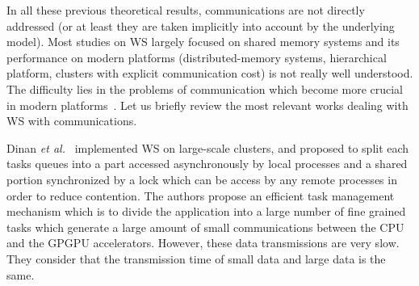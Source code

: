 

In all these previous theoretical results, communications are not directly addressed
(or at least they are taken implicitly into account by the underlying model).
Most studies on WS largely focused on shared memory systems and 
its performance on modern platforms (distributed-memory systems, hierarchical platform, clusters with explicit communication cost) is not really well understood. 
The difficulty lies in the problems of communication which become more crucial in modern platforms~\cite{Arafat2016}.
Let us briefly review the most relevant works dealing with WS with communications.

Dinan \textit{et al.}~\cite{Dinan2009} implemented WS on large-scale clusters,
and proposed to split each tasks queues into a part accessed asynchronously by local processes 
and a shared portion synchronized by a lock which can be access by any remote processes in order to reduce contention.
The authors propose an efficient task management mechanism which is to divide the application into a large
number of fine grained tasks which generate a large amount of small communications between the CPU and the GPGPU accelerators.
However, these data transmissions are very slow.
They consider that the transmission time of small data and large data is the same. 


